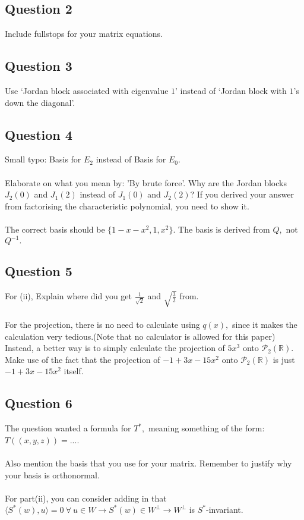 \documentclass{article}
\begin{document}
\subsection*{Question 2}
Include fullstops for your matrix equations.
\subsection*{Question 3}
Use `Jordan block associated with eigenvalue $1$' instead of `Jordan block with $1$'s down the diagonal'.
\subsection*{Question 4}
Small typo: Basis for $E_2$ instead of Basis for $E_0.$\\\\
Elaborate on what you mean by: 'By brute force'. Why are the Jordan blocks $J_2(0)$ and $J_1(2)$ instead of $J_1(0)$ and $J_2(2)$? If you derived your answer from factorising the characteristic polynomial, you need to show it.\\\\
The correct basis should be $\{1 - x - x^2, 1, x^2\}$. The basis is derived from $Q,$ not $Q^{-1}.$
\subsection*{Question 5}
For (ii), Explain where did you get $\frac{1}{\sqrt{2}}$ and $\sqrt{\frac{3}{2}}$ from.\\\\ For the projection, there is no need to calculate using $q(x),$ since it makes the calculation very tedious.(Note that no calculator is allowed for this paper) Instead, a better way is to simply calculate the projection of $5x^3$ onto $\mathcal{P}_2(\mathbb{R})$. Make use of the fact that the projection of $-1 + 3x - 15x^2$ onto $\mathcal{P}_2(\mathbb{R})$ is just $-1 + 3x - 15x^2$ itself.
\subsection*{Question 6}
The question wanted a formula for $T^*,$ meaning something of the form: $T((x,y,z)) = ...$.\\\\
Also mention the basis that you use for your matrix. Remember to justify why your basis is orthonormal.
\\\\For part(ii), you can consider adding in that $\langle S^*(w),u \rangle = 0\ \forall\ u \in W \to S^*(w) \in W^\perp \to W^\perp$ is $S^*$-invariant.
\end{document}
